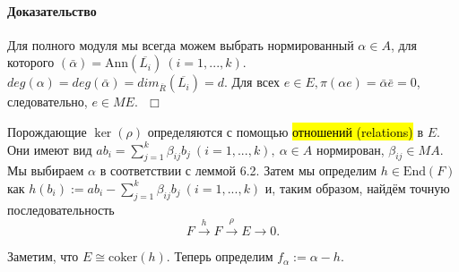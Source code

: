 \documentclass[a4paper,12pt]{article}
\newcommand{\Ann}{\text{Ann}}
\newcommand{\Endom}{\text{End}}
\newcommand{\coker}{\text{coker}}
\begin{document}
\paragraph{Доказательство}
Для полного модуля мы всегда можем выбрать нормированный $\alpha \in A$, для которого $(\bar{\alpha}) = \Ann (\overline{L_i}) ~ (i = 1,...,k)$. $deg(\alpha) = deg(\bar{\alpha}) = dim_{\overline{R}}(\overline{L_i}) = d$. Для всех $e \in E, \pi(\alpha e) = \bar{\alpha} \bar{e} = 0$, следовательно, $e \in M E. ~~~ \Box$

Порождающие $\ker(\rho)$ определяются с помощью \hl{отношений (relations)} в $E$. Они имеют вид $a b_i = \sum_{j = 1}^{k} \beta_{ij} b_j ~ (i = 1, ..., k), ~ \alpha \in A$ нормирован, $\beta_{ij} \in M A$. Мы выбираем $\alpha$ в соответствии с леммой 6.2. Затем мы определим $h \in \Endom(F)$ как $h(b_i) := a b_i - \sum_{j=1}^{k} \beta_{ij} b_j ~ (i = 1, ..., k)$ и, таким образом, найдём точную последовательность
$$
F \overset{h}{\rightarrow} F \overset{\rho}{\rightarrow} E \rightarrow 0.
$$

Заметим, что $E \cong \coker(h)$. Теперь определим $f_\alpha := \alpha - h$.
\end{document}
